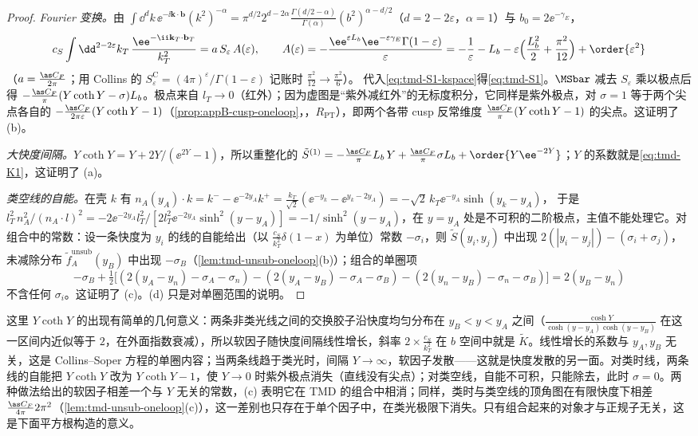 \begin{proof}
\emph{Fourier 变换。}由 $\int\dd^dk\,\ee^{-\ii\mathbf k\cdot\mathbf b}(k^2)^{-\alpha}=\pi^{d/2}2^{d-2\alpha}\frac{\Gamma(d/2-\alpha)}{\Gamma(\alpha)}(b^2)^{\alpha-d/2}$（$d=2-2\varepsilon$，$\alpha=1$）与 $b_0=2\ee^{-\gamma_E}$，
\begin{equation}\label{eq:tmd-A-eps}
c_S\int\dd^{2-2\varepsilon}k_T\,\frac{\ee^{-\ii\mathbf k_T\cdot\mathbf b_T}}{k_T^2}=a\,S_\varepsilon\,A(\varepsilon),\qquad A(\varepsilon)=-\frac{\ee^{\varepsilon L_b}\ee^{-\varepsilon\gamma_E}\Gamma(1-\varepsilon)}{\varepsilon}=-\frac1\varepsilon-L_b-\varepsilon\Big(\frac{L_b^2}{2}+\frac{\pi^2}{12}\Big)+\order{\varepsilon^2}
\end{equation}
（$a=\frac{\as C_F}{2\pi}$；用 Collins 的 $S^{\mathrm C}_\varepsilon=(4\pi)^\varepsilon/\Gamma(1-\varepsilon)$ 记账时 $\frac{\pi^2}{12}\to\frac{\pi^2}{6}$）。%
代入\cref{eq:tmd-S1-kspace}得\cref{eq:tmd-S1}。$\MSbar$ 减去 $S_\varepsilon$ 乘以极点后得 $-\frac{\as C_F}\pi(Y\coth Y-\sigma)L_b$。极点来自 $l_T\to0$（红外）；因为虚图是“紫外减红外”的无标度积分，它同样是紫外极点，对 $\sigma=1$ 等于两个尖点各自的 $-\frac{\as C_F}{2\pi\varepsilon}(Y\coth Y-1)$（\cref{prop:appB-cusp-oneloop}，\tagR，$R_{\mathrm{PT}}$），即两个各带 cusp 反常维度 $\frac{\as C_F}{\pi}(Y\coth Y-1)$ 的尖点。这证明了 (b)。

\emph{大快度间隔。}$Y\coth Y=Y+2Y/(\ee^{2Y}-1)$，所以重整化的 $\tilde S^{(1)}=-\frac{\as C_F}{\pi}L_b\,Y+\frac{\as C_F}{\pi}\sigma L_b+\order{Y\ee^{-2Y}}$；$Y$ 的系数就是\cref{eq:tmd-K1}，这证明了 (a)。

\emph{类空线的自能。}在壳 $k$ 有 $n_A(y_A)\cdot k=k^-- \ee^{-2y_A}k^+=\frac{k_T}{\sqrt2}(\ee^{-y_k}-\ee^{y_k-2y_A})=-\sqrt2\,k_T\ee^{-y_A}\sinh(y_k-y_A)$，%
于是 $l_T^2\,n_A^2/(n_A\cdot l)^2=-2\ee^{-2y_A}l_T^2/[2l_T^2\ee^{-2y_A}\sinh^2(y-y_A)]=-1/\sinh^2(y-y_A)$，在 $y=y_A$ 处是不可积的二阶极点，主值不能处理它。对组合中的常数：设一条快度为 $y_i$ 的线的自能给出（以 $\frac{c_S}{k_T^2}\delta(1-x)$ 为单位）常数 $-\sigma_i$，则 $\tilde S(y_i,y_j)$ 中出现 $2(|y_i-y_j|)-(\sigma_i+\sigma_j)$，未减除分布 $\tilde f_A^{\mathrm{unsub}}(y_B)$ 中出现 $-\sigma_B$（\cref{lem:tmd-unsub-oneloop}(b)）；组合的单圈项
\[
-\sigma_B+\tfrac12\big[(2(y_A-y_n)-\sigma_A-\sigma_n)-(2(y_A-y_B)-\sigma_A-\sigma_B)-(2(y_n-y_B)-\sigma_n-\sigma_B)\big]=2(y_B-y_n)
\]
不含任何 $\sigma_i$。这证明了 (c)。(d) 只是对单圈范围的说明。
\end{proof}

这里 $Y\coth Y$ 的出现有简单的几何意义：两条非类光线之间的交换胶子沿快度均匀分布在 $y_B<y<y_A$ 之间（$\frac{\cosh Y}{\cosh(y-y_A)\cosh(y-y_B)}$ 在这一区间内近似等于 $2$，在外面指数衰减），所以软因子随快度间隔线性增长，斜率 $2\times\frac{c_S}{k_T^2}$ 在 $b$ 空间中就是 $\tilde K$。线性增长的系数与 $y_A,y_B$ 无关，这是 Collins--Soper 方程的单圈内容；当两条线趋于类光时，间隔 $Y\to\infty$，软因子发散——这就是快度发散的另一面。对类时线，两条线的自能把 $Y\coth Y$ 改为 $Y\coth Y-1$，使 $Y\to0$ 时紫外极点消失（直线没有尖点）；对类空线，自能不可积，只能除去，此时 $\sigma=0$。两种做法给出的软因子相差一个与 $Y$ 无关的常数，(c) 表明它在 TMD 的组合中相消；同样，类时与类空线的顶角图在有限快度下相差 $\frac{\as C_F}{4\pi}2\pi^2$（\cref{lem:tmd-unsub-oneloop}(c)），这一差别也只存在于单个因子中，在类光极限下消失。只有组合起来的对象才与正规子无关，这是下面平方根构造的意义。
